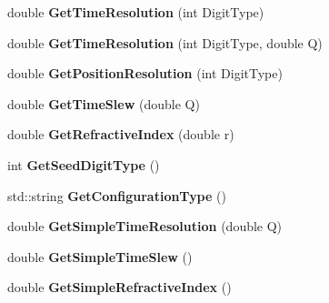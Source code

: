 \begin{DoxyCompactItemize}
\item 
\hypertarget{classParameters_a9923cf8f51802396ddb7deea4329104d}{
double {\bfseries GetTimeResolution} (int DigitType)}
\label{classParameters_a9923cf8f51802396ddb7deea4329104d}

\item 
\hypertarget{classParameters_ae4c02a415ab0ac0290aa4e5b937130f0}{
double {\bfseries GetTimeResolution} (int DigitType, double Q)}
\label{classParameters_ae4c02a415ab0ac0290aa4e5b937130f0}

\item 
\hypertarget{classParameters_a86cfc7d93752dcd1549935fd4c3ef3be}{
double {\bfseries GetPositionResolution} (int DigitType)}
\label{classParameters_a86cfc7d93752dcd1549935fd4c3ef3be}

\item 
\hypertarget{classParameters_a59b9a4a70d5b3a1806e85409ab59fa06}{
double {\bfseries GetTimeSlew} (double Q)}
\label{classParameters_a59b9a4a70d5b3a1806e85409ab59fa06}

\item 
\hypertarget{classParameters_af68d5a1e8b879d8bd3e40619dbdcad17}{
double {\bfseries GetRefractiveIndex} (double r)}
\label{classParameters_af68d5a1e8b879d8bd3e40619dbdcad17}

\item 
\hypertarget{classParameters_a87885862d3dec908cc69488f9a5ba414}{
int {\bfseries GetSeedDigitType} ()}
\label{classParameters_a87885862d3dec908cc69488f9a5ba414}

\item 
\hypertarget{classParameters_a7af86855d446b0d87990a5ee0bec878d}{
std::string {\bfseries GetConfigurationType} ()}
\label{classParameters_a7af86855d446b0d87990a5ee0bec878d}

\item 
\hypertarget{classParameters_a5dc92999b540e49c64c0d9cf989a0a57}{
double {\bfseries GetSimpleTimeResolution} (double Q)}
\label{classParameters_a5dc92999b540e49c64c0d9cf989a0a57}

\item 
\hypertarget{classParameters_a9171fa97b63774daaaab2ba0a4534846}{
double {\bfseries GetSimpleTimeSlew} ()}
\label{classParameters_a9171fa97b63774daaaab2ba0a4534846}

\item 
\hypertarget{classParameters_a30c2cab5179a2beb2ad468f8de91b3c0}{
double {\bfseries GetSimpleRefractiveIndex} ()}
\label{classParameters_a30c2cab5179a2beb2ad468f8de91b3c0}

\end{DoxyCompactItemize}
